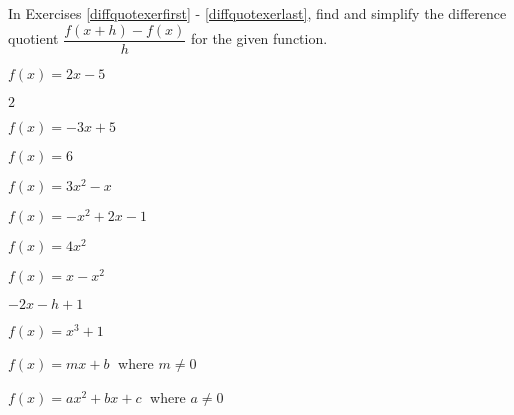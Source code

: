 \documentclass{ximera}
\begin{document}
	\author{Stitz-Zeager}



\label{ExercisesforFunctionArithmetic}

\begin{question}
    
In Exercises \ref{diffquotexerfirst} - \ref{diffquotexerlast}, find and simplify the difference quotient $\dfrac{f(x+h) - f(x)}{h}$ for the given function.

\begin{problem}\label{diffquotexerfirst}
$f(x) = 2x - 5$

\begin{solution}
    $2$
\end{solution}
\end{problem}
 
\begin{problem}
$f(x) = -3x + 5$   
\end{problem} 

\begin{problem}
$f(x) = 6$   
\end{problem}  

\begin{problem}
$f(x) = 3x^2 - x$   
\end{problem} 

\begin{problem}
$f(x) = -x^2 + 2x - 1$   
\end{problem} 

\begin{problem}
$f(x) = 4x^2$   
\end{problem}

\begin{problem}
$f(x) = x-x^2$

\begin{solution}
$-2x-h+1$
\end{solution}
\end{problem} 

\begin{problem}
$f(x) = x^{3} + 1$
\end{problem}  

\begin{problem}
$f(x) = mx + b\;$ where $m \neq 0$
\end{problem} 

\begin{problem}
$f(x) = ax^{2} + bx + c\;$ where $a \neq 0$
\end{problem}  


\end{question}
\end{document}
